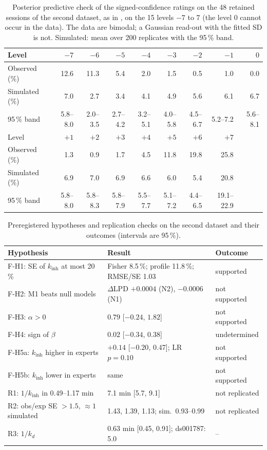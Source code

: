 \documentclass[12pt,a4paper]{article}
\theoremstyle{plain}
\theoremstyle{definition}
\theoremstyle{remark}
\newcommand{\kinh}{k_{\mathrm{inh}}}
\newcommand{\kd}{k_{d}}
\begin{document}
\begin{table}[H]
\centering\footnotesize
\caption{Posterior predictive check of the signed-confidence ratings on the 48 retained sessions of the second dataset, as in , on the 15 levels $-7$ to $7$ (the level 0 cannot occur in the data). The data are bimodal; a Gaussian read-out with the fitted SD is not. Simulated: mean over 200 replicates with the 95\,\% band.}
\label{tab:osf-ppc}
\setlength{\tabcolsep}{3pt}
\begin{tabular}{lrrrrrrrr}
\toprule
Level & $-7$ & $-6$ & $-5$ & $-4$ & $-3$ & $-2$ & $-1$ & $0$ \\
\midrule
Observed (\%)  & 12.6 & 11.3 & 5.4 & 2.0 & 1.5 & 0.5 & 1.0 & 0.0 \\
Simulated (\%) & 7.0 & 2.7 & 3.4 & 4.1 & 4.9 & 5.6 & 6.1 & 6.7 \\
95\,\% band    & 5.8--8.0 & 2.0--3.5 & 2.7--4.2 & 3.2--5.1 & 4.0--5.8 & 4.5--6.7 & 5.2--7.2 & 5.6--8.1 \\
\midrule
Level & $+1$ & $+2$ & $+3$ & $+4$ & $+5$ & $+6$ & $+7$ & \\
\midrule
Observed (\%)  & 1.3 & 0.9 & 1.7 & 4.5 & 11.8 & 19.8 & 25.8 & \\
Simulated (\%) & 6.9 & 7.0 & 6.9 & 6.6 & 6.0 & 5.4 & 20.8 & \\
95\,\% band    & 5.8--8.0 & 5.8--8.3 & 5.8--7.9 & 5.5--7.7 & 5.1--7.2 & 4.4--6.5 & 19.1--22.9 & \\
\bottomrule
\end{tabular}
\end{table}

\begin{table}[H]
\centering\footnotesize
\caption{Preregistered hypotheses and replication checks on the second dataset and their outcomes (intervals are 95\,\%).}
\label{tab:osf-tests}
\setlength{\tabcolsep}{3pt}
\begin{tabular}{lll}
\toprule
Hypothesis & Result & Outcome \\
\midrule
F-H1: SE of $\kinh$ at most 20\,\% & Fisher 8.5\,\%; profile 11.8\,\%; RMSE/SE 1.03 & supported \\
F-H2: M1 beats null models & $\Delta$LPD $+0.0004$ (N2), $-0.0006$ (N1) & not supported \\
F-H3: $\alpha>0$ & $0.79$ [$-0.24$, $1.82$] & not supported \\
F-H4: sign of $\beta$ & $0.02$ [$-0.34$, $0.38$] & undetermined \\
F-H5a: $\kinh$ higher in experts & $+0.14$ [$-0.20$, $0.47$]; LR $p=0.10$ & not supported \\
F-H5b: $\kinh$ lower in experts & same & not supported \\
R1: $1/\kinh$ in 0.49--1.17 min & 7.1 min [5.7, 9.1] & not replicated \\
R2: obs/exp SE $>1.5$, $\approx1$ simulated & 1.43, 1.39, 1.13; sim.\ 0.93--0.99 & not replicated \\
R3: $1/\kd$ & 0.63 min [0.45, 0.91]; ds001787: 5.0 & -- \\
\bottomrule
\end{tabular}
\end{table}
\end{document}
